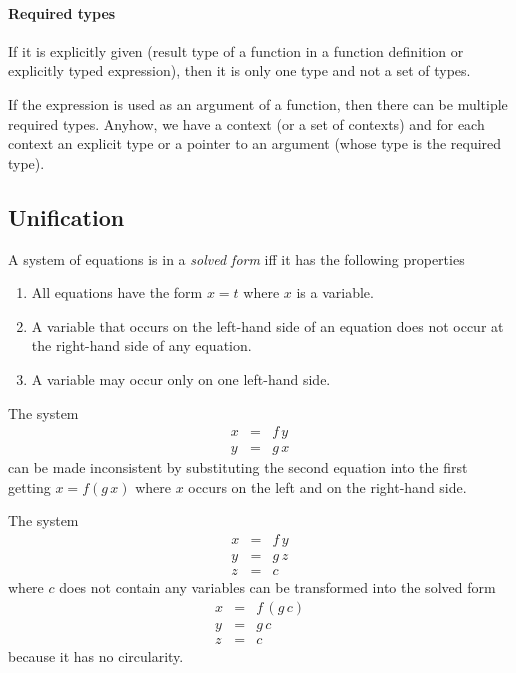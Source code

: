 \paragraph{Required types}
If it is explicitly given (result type of a function in a function definition
or explicitly typed expression), then it is only one type and not a set of
types.

If the expression is used as an argument of a function, then there can be
multiple required types. Anyhow, we have a context (or a set of contexts) and
for each context an explicit type or a pointer to an argument (whose type is
the required type).




\subsection{Unification}


A system of equations is in a \emph{solved form} iff it has the following
properties
%
\begin{enumerate}

\item All equations have the form $x = t$ where $x$ is a variable.

\item A variable that occurs on the left-hand side of an equation does not
  occur at the right-hand side of any equation.

\item A variable may occur only on one left-hand side.
\end{enumerate}

The system
$$
%
\begin{array}{lll}
  x &=& f\, y
  \\
  y &=& g\, x
\end{array}
$$
%
can be made inconsistent by substituting the second equation into the first
getting $x = f (g\, x)$ where $x$ occurs on the left and on the right-hand side.

The system
$$
\begin{array}{lll}
  x &=& f\, y
  \\
  y &=& g\, z
  \\
  z &=& c
\end{array}
$$
%
where $c$ does not contain any variables can be transformed into the solved
form
$$
\begin{array}{lll}
  x &=& f\, (g \, c)
  \\
  y &=& g\, c
  \\
  z &=& c
\end{array}
$$
%
because it has no circularity.

